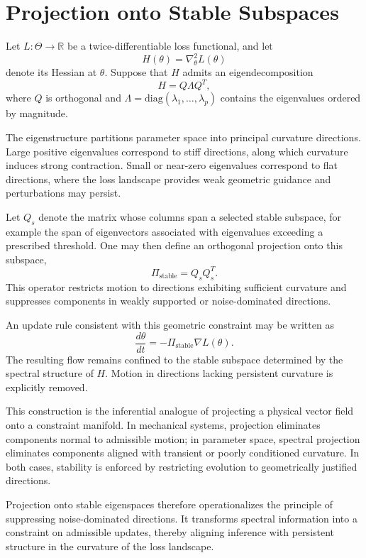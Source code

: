 \documentclass[12pt]{book}
\begin{document}
\section{Projection onto Stable Subspaces}

Let $L : \Theta \to \mathbb{R}$ be a twice-differentiable loss functional, and let
\[
H(\theta) = \nabla_\theta^2 L(\theta)
\]
denote its Hessian at $\theta$. Suppose that $H$ admits an eigendecomposition
\[
H = Q \Lambda Q^T,
\]
where $Q$ is orthogonal and $\Lambda = \mathrm{diag}(\lambda_1, \dots, \lambda_p)$ contains the eigenvalues ordered by magnitude.

The eigenstructure partitions parameter space into principal curvature directions. Large positive eigenvalues correspond to stiff directions, along which curvature induces strong contraction. Small or near-zero eigenvalues correspond to flat directions, where the loss landscape provides weak geometric guidance and perturbations may persist.

Let $Q_s$ denote the matrix whose columns span a selected stable subspace, for example the span of eigenvectors associated with eigenvalues exceeding a prescribed threshold. One may then define an orthogonal projection onto this subspace,
\[
\Pi_{\text{stable}} = Q_s Q_s^T.
\]
This operator restricts motion to directions exhibiting sufficient curvature and suppresses components in weakly supported or noise-dominated directions.

An update rule consistent with this geometric constraint may be written as
\[
\frac{d\theta}{dt}
=
- \Pi_{\text{stable}} \nabla L(\theta).
\]
The resulting flow remains confined to the stable subspace determined by the spectral structure of $H$. Motion in directions lacking persistent curvature is explicitly removed.

This construction is the inferential analogue of projecting a physical vector field onto a constraint manifold. In mechanical systems, projection eliminates components normal to admissible motion; in parameter space, spectral projection eliminates components aligned with transient or poorly conditioned curvature. In both cases, stability is enforced by restricting evolution to geometrically justified directions.

Projection onto stable eigenspaces therefore operationalizes the principle of suppressing noise-dominated directions. It transforms spectral information into a constraint on admissible updates, thereby aligning inference with persistent structure in the curvature of the loss landscape.
\end{document}
